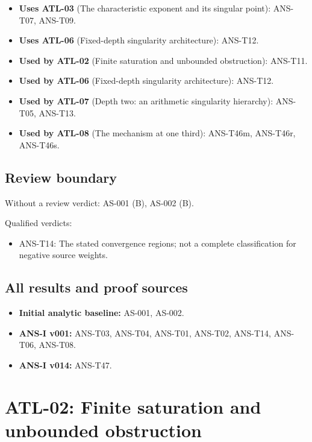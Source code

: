 \documentclass[
  11pt,
]{article}
\providecommand{\tightlist}{%
  \setlength{\itemsep}{0pt}\setlength{\parskip}{0pt}}
\begin{document}
\begin{itemize}
\tightlist
\item
  \textbf{Uses ATL-03} (The characteristic exponent and its singular
  point): ANS-T07, ANS-T09.
\item
  \textbf{Uses ATL-06} (Fixed-depth singularity architecture): ANS-T12.
\item
  \textbf{Used by ATL-02} (Finite saturation and unbounded obstruction):
  ANS-T11.
\item
  \textbf{Used by ATL-06} (Fixed-depth singularity architecture):
  ANS-T12.
\item
  \textbf{Used by ATL-07} (Depth two: an arithmetic singularity
  hierarchy): ANS-T05, ANS-T13.
\item
  \textbf{Used by ATL-08} (The mechanism at one third): ANS-T46m,
  ANS-T46r, ANS-T46s.
\end{itemize}

\hypertarget{review-boundary}{%
\subsection{Review boundary}\label{review-boundary}}

Without a review verdict: AS-001 (B), AS-002 (B).

Qualified verdicts:

\begin{itemize}
\tightlist
\item
  ANS-T14: The stated convergence regions; not a complete classification
  for negative source weights.
\end{itemize}

\hypertarget{all-results-and-proof-sources}{%
\subsection{All results and proof
sources}\label{all-results-and-proof-sources}}

\begin{itemize}
\tightlist
\item
  \textbf{Initial analytic baseline:} AS-001, AS-002.
\item
  \textbf{ANS-I v001:} ANS-T03, ANS-T04, ANS-T01, ANS-T02, ANS-T14,
  ANS-T06, ANS-T08.
\item
  \textbf{ANS-I v014:} ANS-T47.
\end{itemize}

\hypertarget{atl-02-finite-saturation-and-unbounded-obstruction}{%
\section{ATL-02: Finite saturation and unbounded
obstruction}\label{atl-02-finite-saturation-and-unbounded-obstruction}}
\end{document}
